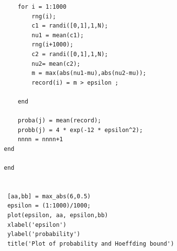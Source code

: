 \documentclass[12pt]{article}
\begin{document}
\begin{appendices}
\begin{lstlisting}
    for i = 1:1000
        rng(i);
        c1 = randi([0,1],1,N);
        nu1 = mean(c1);
        rng(i+1000);
        c2 = randi([0,1],1,N);
        nu2= mean(c2);
        m = max(abs(nu1-mu),abs(nu2-mu));
        record(i) = m > epsilon ;

    end

    proba(j) = mean(record);
    probb(j) = 4 * exp(-12 * epsilon^2);
    nnnn = nnnn+1
end

end


 [aa,bb] = max_abs(6,0.5)
 epsilon = (1:1000)/1000;
 plot(epsilon, aa, epsilon,bb)
 xlabel('epsilon')
 ylabel('probability')
 title('Plot of probability and Hoeffding bound')
  \end{lstlisting}

\end{appendices}
\end{document}
